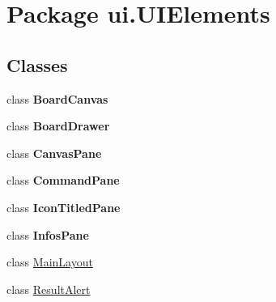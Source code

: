 \hypertarget{namespaceui_1_1_u_i_elements}{}\section{Package ui.\+U\+I\+Elements}
\label{namespaceui_1_1_u_i_elements}
\subsection*{Classes}
\begin{DoxyCompactItemize}
\item 
class {\bfseries Board\+Canvas}
\item 
class {\bfseries Board\+Drawer}
\item 
class {\bfseries Canvas\+Pane}
\item 
class {\bfseries Command\+Pane}
\item 
class {\bfseries Icon\+Titled\+Pane}
\item 
class {\bfseries Infos\+Pane}
\item 
class \mbox{\hyperlink{classui_1_1_u_i_elements_1_1_main_layout}{Main\+Layout}}
\item 
class \mbox{\hyperlink{classui_1_1_u_i_elements_1_1_result_alert}{Result\+Alert}}
\end{DoxyCompactItemize}
